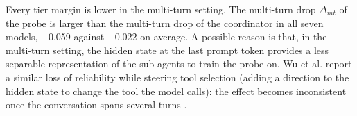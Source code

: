 Every tier margin is lower in the multi-turn setting. The multi-turn drop $\Delta_{mt}$ of the probe is larger than the multi-turn drop of the coordinator in all seven models, $-$0.059 against $-$0.022 on average. A possible reason is that, in the multi-turn setting, the hidden state at the last prompt token provides a less separable representation of the sub-agents to train the probe on. Wu et al. report a similar loss of reliability while steering tool selection (adding a direction to the hidden state to change the tool the model calls): the effect becomes inconsistent once the conversation spans several turns \cite{wuToolCallingLinearly2026}.

\FloatBarrier
